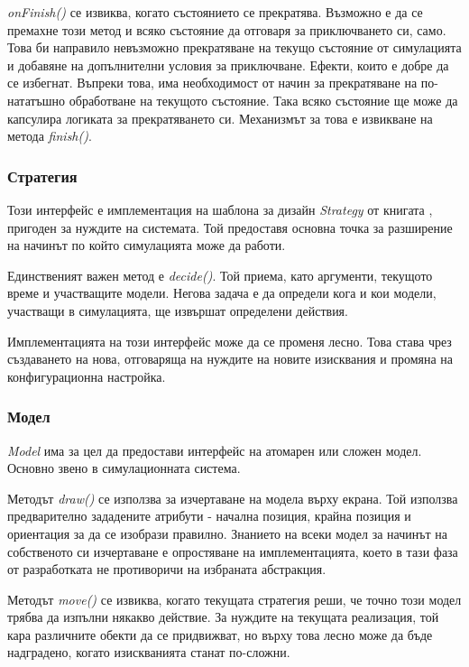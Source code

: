 			\emph{onFinish()} се извиква, когато състоянието се прекратява. Възможно е да се премахне този метод и 
			всяко състояние да отговаря за приключването си, само. Това би направило невъзможно
			прекратяване на текущо състояние от симулацията и добавяне на допълнителни условия за приключване. 
			Ефекти, които е добре да се избегнат. Въпреки това, има необходимост от начин за прекратяване на по-нататъшно обработване
			на текущото състояние. Така всяко състояние ще може да капсулира логиката за прекратяването си. Механизмът
			за това е извикване на метода \emph{finish()}.
		
		\subsubsection{Стратегия}
		
			Този интерфейс е имплементация на шаблона за дизайн \emph{Strategy} от книгата \cite{Gamma}, 
			пригоден за нуждите на системата. Той предоставя основна точка за разширение на начинът
			по който симулацията може да работи.
			
			Единственият важен метод е \emph{decide()}. Той приема, като аргументи, текущото време и участващите модели.
			Негова задача е да определи кога и кои модели, участващи в симулацията, ще извършат определени действия.
			
			Имплементацията на този интерфейс може да се променя лесно. Това става чрез създаването на нова, отговаряща
			на нуждите на новите изисквания и промяна на конфигурационна настройка.

		\subsubsection{Модел}		
		
			\emph{Model} има за цел да предостави интерфейс на атомарен или сложен модел. Основно
			звено в симулационната система.		
			
			Методът \emph{draw()} се използва за изчертаване на модела върху екрана. Той използва
			предварително зададените атрибути - начална позиция, крайна позиция и ориентация за
			да се изобрази правилно. Знанието на всеки модел за начинът на собственото си изчертаване
			е опростяване на имплементацията, което в тази фаза от разработката не противоричи
			на избраната абстракция.
			
			Методът \emph{move()} се извиква, когато текущата стратегия реши, че точно този модел
			трябва да изпълни някакво действие. За нуждите на текущата реализация, той кара
			различните обекти да се придвижват, но върху това лесно може да бъде надградено,
			когато изискванията станат по-сложни.
		
